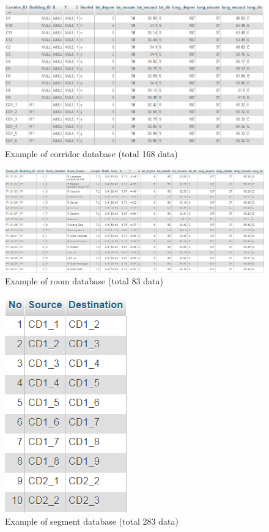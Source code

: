 \begin{figure}[h!]
	\centering
	\includegraphics[scale=0.7]{DBcorridor.PNG}
	\caption{Example of corridor database (total 168 data)
	}
	\label{DBcorridor}
\end{figure}

\begin{figure}[h!]
	\centering
	\includegraphics[scale=0.6]{DBroom.PNG}
	\caption{Example of room database (total 83 data)
	}
	\label{DBcorridor}
\end{figure}

\begin{figure}[h!]
	\centering
	\includegraphics[scale=0.6]{DBsegment.PNG}
	\caption{Example of segment database (total 283 data)
	}
	\label{DBsegment}
\end{figure}

